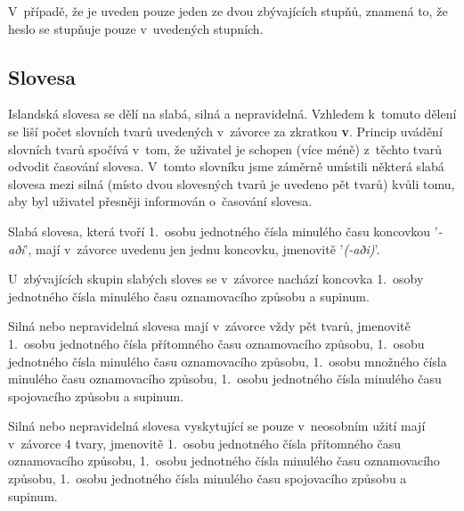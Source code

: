 V~případě, že je uveden pouze jeden ze dvou zbývajících stupňů, znamená to, že heslo se stupňuje pouze v~uvedených stupních.

\blspace
  \dicEntry {}  
\blspace

\subsection*{Slovesa}

Islandská slovesa se dělí na slabá, silná a nepravidelná. Vzhledem k~tomuto dělení se liší počet slovních tvarů uvedených v~závorce za zkratkou \textbf{v}. Princip uvádění slovních tvarů spočívá v~tom, že uživatel
je schopen (více méně) z~těchto tvarů odvodit časování slovesa. V~tomto slovníku jsme
záměrně umístili některá slabá slovesa mezi silná (místo dvou slovesných tvarů je uvedeno pět tvarů) kvůli tomu, aby byl uživatel přesněji informován o~časování slovesa.

Slabá slovesa, která tvoří 1.~osobu jednotného čísla minulého času koncovkou '\textit{-aði}', mají v~závorce uvedenu jen jednu koncovku, jmenovitě '\textit{(-aði)}'.

\blspace
  \dicEntry {}  
\blspace

U~zbývajících skupin slabých sloves se v~závorce nachází koncovka 1.~osoby jednotného čísla minulého času oznamovacího způsobu a supinum.

\blspace
  \dicEntry {}  
\blspace

Silná nebo nepravidelná slovesa mají v~závorce vždy pět tvarů, jmenovitě 1.~osobu jednotného čísla přítomného času oznamovacího způsobu, 1.~osobu jednotného čísla minulého času oznamovacího způsobu, 1.~osobu množného čísla minulého času oznamovacího způsobu, 1.~osobu jednotného čísla minulého času spojovacího způsobu a supinum.

\blspace
  \dicEntry {}  
\blspace

Silná nebo nepravidelná slovesa vyskytující se pouze v~neosobním užití mají v~závorce 4 tvary, jmenovitě 1.~osobu jednotného čísla přítomného času oznamovacího způsobu, 1.~osobu jednotného čísla minulého času oznamovacího způsobu, 1.~osobu jednotného čísla minulého času spojovacího způsobu a supinum.

\blspace
  \dicEntry {}  
\blspace

